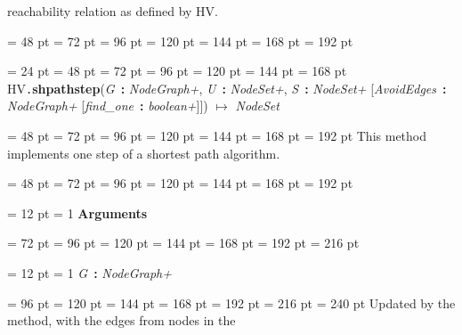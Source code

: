 {{{{{{reachability relation as defined by HV.\par}
\par}
\par}
{\par \noindent  \leftskip = 48 pt  \leftmargini = 72 pt  \leftmarginii = 96 pt  \leftmarginiii = 120 pt  \leftmarginiv = 144 pt  \leftmarginv = 168 pt  \leftmarginvi = 192 pt {\par \noindent
\par}
\par}
\par}
\par}
{\par \noindent  \leftskip = 24 pt  \leftmargini = 48 pt  \leftmarginii = 72 pt  \leftmarginiii = 96 pt  \leftmarginiv = 120 pt  \leftmarginv = 144 pt  \leftmarginvi = 168 pt HV{\tt .\/}{\bf {\large {\bf shpathstep\/}}\/}({\em G\/}~{\bf :}  {\em NodeGraph+\/}, {\em U\/}~{\bf :}  {\em NodeSet+\/}, {\em S\/}~{\bf :}  {\em NodeSet+\/}  {[}{\em AvoidEdges\/}~{\bf :}  {\em NodeGraph+\/}  {[}{\em find{\_}one\/}~{\bf :}  {\em boolean+\/}]]) \(\mapsto \)  {\em NodeSet\/}{\par \noindent
{\par \noindent  \leftskip = 48 pt  \leftmargini = 72 pt  \leftmarginii = 96 pt  \leftmarginiii = 120 pt  \leftmarginiv = 144 pt  \leftmarginv = 168 pt  \leftmarginvi = 192 pt  This method implements one step of a shortest path algorithm.
\par}
{\par \noindent  \leftskip = 48 pt  \leftmargini = 72 pt  \leftmarginii = 96 pt  \leftmarginiii = 120 pt  \leftmarginiv = 144 pt  \leftmarginv = 168 pt  \leftmarginvi = 192 pt {\par \noindent
{\par \pagebreak[3.100000] \noindent \hangindent = 12 pt \hangafter = 1 
{\bf Arguments\/}\par}
{\par \noindent  \leftskip = 72 pt  \leftmargini = 96 pt  \leftmarginii = 120 pt  \leftmarginiii = 144 pt  \leftmarginiv = 168 pt  \leftmarginv = 192 pt  \leftmarginvi = 216 pt {\par \noindent
{\par \pagebreak[3.000000] \noindent \hangindent = 12 pt \hangafter = 1 
{\em G\/}~{\bf :}  {\em NodeGraph+\/}\par}
{\par \noindent  \leftskip = 96 pt  \leftmargini = 120 pt  \leftmarginii = 144 pt  \leftmarginiii = 168 pt  \leftmarginiv = 192 pt  \leftmarginv = 216 pt  \leftmarginvi = 240 pt          Updated by the method, with the edges from nodes in the
}}}}}}}}
